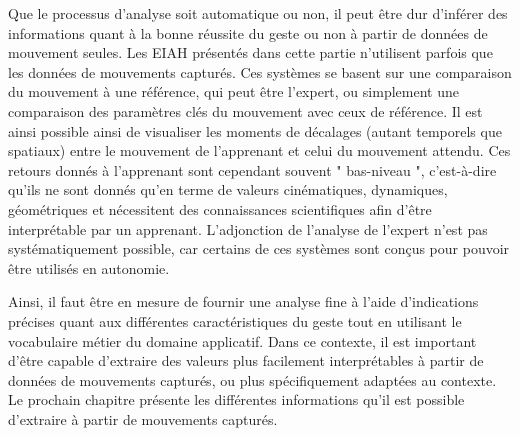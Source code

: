 Que le processus d'analyse soit automatique ou non, il peut être dur d'inférer des informations quant à la bonne réussite du geste ou non à partir de données de mouvement seules. Les EIAH présentés dans cette partie n'utilisent parfois que les données de mouvements capturés. Ces systèmes se basent sur une comparaison du mouvement à une référence, qui peut être l'expert, ou simplement une comparaison des paramètres clés du mouvement avec ceux de référence. Il est ainsi possible ainsi de visualiser les moments de décalages (autant temporels que spatiaux) entre le mouvement de l'apprenant et celui du mouvement attendu. Ces retours donnés à l'apprenant sont cependant souvent " bas-niveau ", c'est-à-dire qu'ils ne sont donnés qu'en terme de valeurs cinématiques, dynamiques, géométriques et nécessitent des connaissances scientifiques afin d'être interprétable par un apprenant. L'adjonction de l'analyse de l'expert n'est pas systématiquement possible, car certains de ces systèmes sont conçus pour pouvoir être utilisés en autonomie.

Ainsi, il faut être en mesure de fournir une analyse fine à l'aide d'indications précises quant aux différentes caractéristiques du geste tout en utilisant le vocabulaire métier du domaine applicatif. Dans ce contexte, il est important d'être capable d'extraire des valeurs plus facilement interprétables à partir de données de mouvements capturés, ou plus spécifiquement adaptées au contexte. Le prochain chapitre présente les différentes informations qu'il est possible d'extraire à partir de mouvements capturés.

